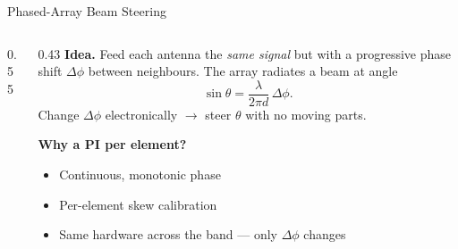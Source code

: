 \documentclass[10pt, aspectratio=169]{beamer}
\begin{document}
\begin{frame}{Phased-Array Beam Steering}
\begin{columns}[T]
\begin{column}{0.55\linewidth}
    \end{column}
    \begin{column}{0.43\linewidth}
      \textbf{Idea.} Feed each antenna the \emph{same signal} but with
      a progressive phase shift $\Delta\phi$ between neighbours. The
      array radiates a beam at angle
      \[
        \boxed{\;\sin\theta
          = \frac{\lambda}{2\pi d}\,\Delta\phi.\;}
      \]
      Change $\Delta\phi$ electronically $\to$ steer $\theta$
      with no moving parts.

      \medskip
      \textbf{Why a PI per element?}
      \begin{itemize}
        \item Continuous, monotonic phase
        \item Per-element skew calibration
        \item Same hardware across the band — only $\Delta\phi$ changes
      \end{itemize}
    \end{column}
  \end{columns}
\end{frame}
\end{document}
